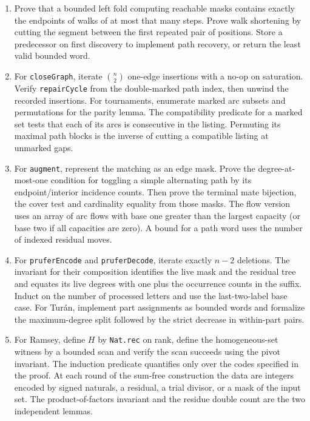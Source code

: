 \begin{enumerate}
\item Prove that a bounded left fold computing reachable masks contains exactly the endpoints of walks of at most that many steps. Prove walk shortening by cutting the segment between the first repeated pair of positions. Store a predecessor on first discovery to implement path recovery, or return the least valid bounded word.
\item For \texttt{closeGraph}, iterate $\binom n2$ one-edge insertions with a no-op on saturation. Verify \texttt{repairCycle} from the double-marked path index, then unwind the recorded insertions. For tournaments, enumerate marked arc subsets and permutations for the parity lemma. The compatibility predicate for a marked set tests that each of its arcs is consecutive in the listing. Permuting its maximal path blocks is the inverse of cutting a compatible listing at unmarked gaps.
\item For \texttt{augment}, represent the matching as an edge mask. Prove the degree-at-most-one condition for toggling a simple alternating path by its endpoint/interior incidence counts. Then prove the terminal mate bijection, the cover test and cardinality equality from those masks. The flow version uses an array of arc flows with base one greater than the largest capacity (or base two if all capacities are zero). A bound for a path word uses the number of indexed residual moves.
\item For \texttt{pruferEncode} and \texttt{pruferDecode}, iterate exactly $n-2$ deletions. The invariant for their composition identifies the live mask and the residual tree and equates its live degrees with one plus the occurrence counts in the suffix. Induct on the number of processed letters and use the last-two-label base case. For Tur\'an, implement part assignments as bounded words and formalize the maximum-degree split followed by the strict decrease in within-part pairs.
\item For Ramsey, define $H$ by \texttt{Nat.rec} on rank, define the homogeneous-set witness by a bounded scan and verify the scan succeeds using the pivot invariant. The induction predicate quantifies only over the codes specified in the proof. At each round of the sum-free construction the data are integers encoded by signed naturals, a residual, a trial divisor, or a mask of the input set. The product-of-factors invariant and the residue double count are the two independent lemmas.
\end{enumerate}

